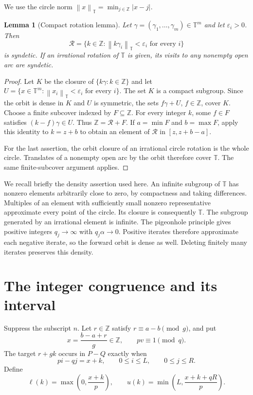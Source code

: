 \documentclass[11pt,leqno]{amsart}
\numberwithin{equation}{section}
\newtheorem{lemma}[theorem]{Lemma}
\theoremstyle{definition}
\theoremstyle{remark}
\newcommand{\Z}{\mathbb Z}
\newcommand{\T}{\mathbb T}
\newcommand{\normt}[1]{\left\|#1\right\|_{\T}}
\begin{document}
We use the circle norm $\normt{x}=\min_{j\in\Z}|x-j|$.

\begin{lemma}[Compact rotation lemma]\label{lem:rotation}
Let $\gamma=(\gamma_1,\ldots,\gamma_m)\in\T^m$ and let $\varepsilon_i>0$. Then
\[
\mathcal R=\{k\in\Z:\normt{k\gamma_i}<\varepsilon_i\text{ for every }i\}
\]
is syndetic. If an irrational rotation of $\T$ is given, its visits to any nonempty open arc are syndetic.
\end{lemma}
\begin{proof}
Let $K$ be the closure of $\{k\gamma:k\in\Z\}$ and let
$U=\{x\in\T^m:\normt{x_i}<\varepsilon_i\text{ for every }i\}$.
The set $K$ is a compact subgroup. Since the orbit is dense in $K$ and $U$ is symmetric, the sets $f\gamma+U$, $f\in\Z$, cover $K$. Choose a finite subcover indexed by $F\subseteq\Z$. For every integer $k$, some $f\in F$ satisfies $(k-f)\gamma\in U$. Thus $\Z=\mathcal R+F$. If $a=\min F$ and $b=\max F$, apply this identity to $k=z+b$ to obtain an element of $\mathcal R$ in $[z,z+b-a]$.

For the last assertion, the orbit closure of an irrational circle rotation is the whole circle. Translates of a nonempty open arc by the orbit therefore cover $\T$. The same finite-subcover argument applies.
\end{proof}

We recall briefly the density assertion used here. An infinite subgroup of $\T$ has nonzero elements arbitrarily close to zero, by compactness and taking differences. Multiples of an element with sufficiently small nonzero representative approximate every point of the circle. Its closure is consequently $\T$. The subgroup generated by an irrational element is infinite. The pigeonhole principle gives positive integers $q_j\to\infty$ with $q_j\alpha\to0$. Positive iterates therefore approximate each negative iterate, so the forward orbit is dense as well. Deleting finitely many iterates preserves this density.

\section{The integer congruence and its interval}

Suppress the subscript $n$. Let $r\in\Z$ satisfy $r\equiv a-b\pmod g$, and put
\[
x=\frac{b-a+r}{g}\in\Z,
\qquad pv\equiv1\pmod q.
\]
The target $r+gk$ occurs in $P-Q$ exactly when
\begin{equation}\label{eq:diophantine}
pi-qj=x+k,\qquad 0\le i\le L,\qquad0\le j\le R.
\end{equation}
Define
\begin{equation}\label{eq:endpoints}
\ell(k)=\max\left(0,\frac{x+k}{p}\right),
\qquad
u(k)=\min\left(L,\frac{x+k+qR}{p}\right).
\end{equation}
\end{document}
